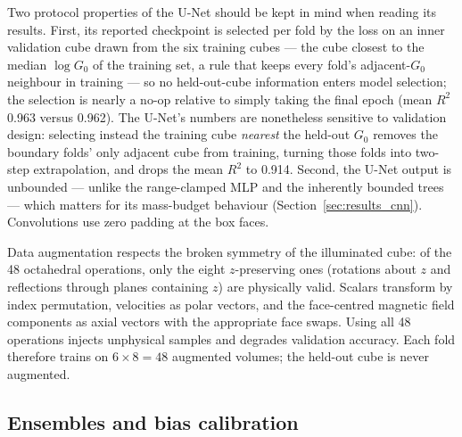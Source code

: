 \documentclass[fleqn,usenatbib]{rasti}
\newcommand{\Gzero}{G_0}
\newcommand{\Rsq}{R^2}
\begin{document}
Two protocol properties of the U-Net should be kept in mind when
reading its results. First, its reported checkpoint is selected per
fold by the loss on an inner validation cube drawn from the six
training cubes --- the cube closest to the median \(\log\Gzero\) of the
training set, a rule that keeps every fold's adjacent-\(\Gzero\)
neighbour in training --- so no held-out-cube information enters model
selection; the selection is nearly a no-op relative to simply taking
the final epoch (mean \(\Rsq\) 0.963 versus 0.962). The U-Net's numbers
are nonetheless sensitive to validation design: selecting instead the
training cube \emph{nearest} the held-out \(\Gzero\) removes the
boundary folds' only adjacent cube from training, turning those folds
into two-step extrapolation, and drops the mean \(\Rsq\) to 0.914.
Second, the U-Net output is unbounded ---
unlike the range-clamped MLP and the inherently bounded trees --- which
matters for its mass-budget behaviour
(Section~\ref{sec:results_cnn}). Convolutions use zero padding at the
box faces.

Data augmentation respects the broken symmetry of the illuminated cube:
of the 48 octahedral operations, only the eight \(z\)-preserving ones
(rotations about \(z\) and reflections through planes containing \(z\)) are
physically valid. Scalars transform by index permutation, velocities as
polar vectors, and the face-centred magnetic field components as axial
vectors with the appropriate face swaps. Using all 48 operations
injects unphysical samples and degrades validation accuracy. Each fold
therefore trains on \(6 \times 8 = 48\) augmented volumes; the held-out
cube is never augmented.

\subsection{Ensembles and bias calibration}
\label{sec:ensemble}
\end{document}

